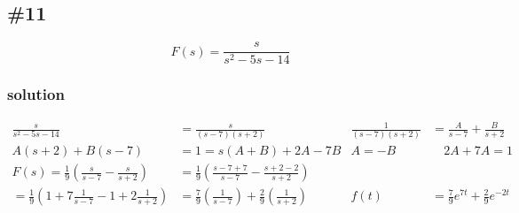 \documentclass{article}
\begin{document}
\subsection*{\#11}
\[F(s)=\frac{s}{s^2-5s-14}\]
\subsubsection*{solution}
\begin{align*}
	\frac{s}{s^2-5s-14}&=\frac{s}{(s-7)(s+2)} &
	\frac{1}{(s-7)(s+2)}&=\frac{A}{s-7}+\frac{B}{s+2}\\
	A(s+2)+B(s-7)&=1=s(A+B)+2A-7B & A=-B &\quad 2A+7A=1\\
	F(s)=\frac{1}{9}\left(\frac{s}{s-7}-\frac{s}{s+2}\right)&=\frac{1}{9}\left(\frac{s-7+7}{s-7}-\frac{s+2-2}{s+2}\right) \\
	=\frac{1}{9}\left(1+7\frac{1}{s-7}-1+2 \frac{1}{s+2}\right)&=\frac{7}{9}\left(\frac{1}{s-7}\right)+\frac{2}{9}\left(\frac{1}{s+2}\right) & f(t)&=\frac{7}{9}e^{7t}+\frac{2}{9}e^{-2t}
\end{align*}
\end{document}
